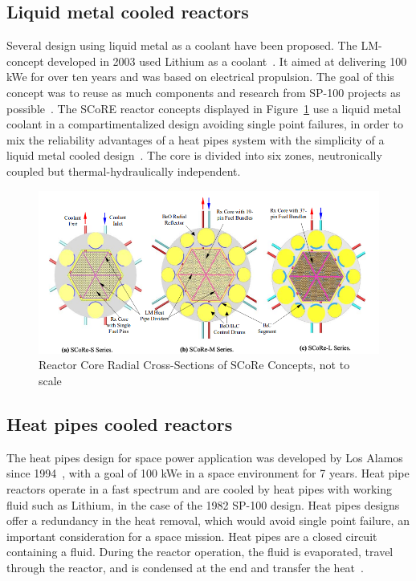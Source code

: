 \documentclass{article}
\begin{document}
\subsection{Liquid metal cooled reactors}

Several design using liquid metal as a coolant have been proposed. The LM-concept developed in 2003 used Lithium as a coolant~\cite{weitzberg2003liquid}. It aimed at delivering 100 kWe for over ten years and was based on electrical propulsion. The goal of this concept was to reuse as much components and research from SP-100 projects as possible~\cite{weitzberg2003liquid}. The SCoRE reactor concepts displayed in Figure~\ref{SCoRE} use a liquid metal coolant in a compartimentalized design avoiding single point failures, in order to mix the reliability advantages of a heat pipes system with the simplicity of a liquid metal cooled design~\cite{el2005score}. The core is divided into six zones, neutronically coupled but thermal-hydraulically independent.


\begin{figure}[]
	\centering
	\includegraphics[height=0.35\textheight]{fig/SCoRE}
	\caption[Reactor Core Radial Cross-Sections of SCoRe Concepts]{Reactor Core Radial Cross-Sections of SCoRe Concepts, not to scale~\cite{el2005score}}
	\label{SCoRE}
\end{figure}


\subsection{Heat pipes cooled reactors}
\label{heatpipe}

The heat pipes design for space power application was developed by Los Alamos since 1994~\cite{poston2001heatpipe}, with a goal of 100 kWe in a space environment for 7 years. Heat pipe reactors operate in a fast spectrum and are cooled by heat pipes with working fluid such as Lithium, in the case of the 1982 SP-100 design. Heat pipes designs offer a redundancy in the heat removal, which would avoid single point failure, an important consideration for a space mission. Heat pipes are a closed circuit containing a fluid. During the reactor operation, the fluid is evaporated, travel through the reactor, and is condensed at the end and transfer the heat~\cite{reid1999heat,dean1985heat}.
\end{document}
